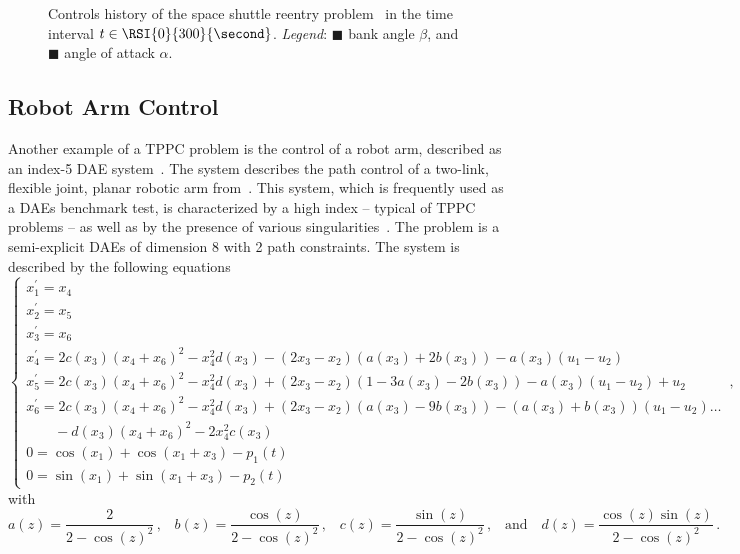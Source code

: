 \begin{figure}[htb]
  \centering
  \small{}
  \caption{Controls history of the space shuttle reentry problem~\cite{brenan1995numerical} in the time interval $t \in \RSI{0}{300}{\second}$. \emph{Legend}: \textcolor{mycolor1}{$\blacksquare$} bank angle $\beta$, and \textcolor{mycolor2}{$\blacksquare$} angle of attack $\alpha$.}
  \label{chap4:fig:tppc_final}
\end{figure}

\subsection{Robot Arm Control}

Another example of a \ac{TPPC} problem is the control of a robot arm, described as an index-5 \ac{DAE} system~\cite{pryce1998solving}. The system describes the path control of a two-link, flexible joint, planar robotic arm from~\cite{campbell1988general}. This system, which is frequently used as a \acp{DAE} benchmark test, is characterized by a high index -- typical of \ac{TPPC} problems -- as well as by the presence of various singularities~\cite{schwarz2020singularities}. The problem is a semi-explicit \acp{DAE} of dimension 8 with 2 path constraints. The system is described by the following equations
%
\begin{equation}
  \begin{cases}
    x_1^{\prime} = x_4 \\
    x_2^{\prime} = x_5 \\
    x_3^{\prime} = x_6 \\
    x_4^{\prime} = 2c(x_3)(x_4+x_6)^2 - x_4^2d(x_3) - (2x_3-x_2)(a(x_3)+2b(x_3)) - a(x_3)(u_1-u_2) \\
    x_5^{\prime} = 2c(x_3)(x_4+x_6)^2 - x_4^2d(x_3) + (2 x_3-x_2)(1-3a(x_3)-2b(x_3)) - a(x_3)(u_1-u_2) + u_2 \\
    x_6^{\prime} = 2c(x_3)(x_4+x_6)^2 - x_4^2d(x_3) + (2 x_3-x_2)(a(x_3)-9b(x_3)) - (a(x_3)+b(x_3))(u_1-u_2) \dots \\
    \qquad - d(x_3)(x_4+x_6)^2 - 2x_4^2c(x_3) \\
    0 = \cos(x_1) + \cos(x_1+x_3) - p_1(t) \\
    0 = \sin(x_1) + \sin(x_1+x_3) - p_2(t)
  \end{cases} \, \text{,}
\end{equation}
%
with
%
\begin{equation}
  a(z) = \dfrac{2}{2-\cos(z)^2} \, \text{,}
  \quad
  b(z) = \dfrac{\cos(z)}{2-\cos(z)^2} \, \text{,}
  \quad
  c(z) = \dfrac{\sin(z)}{2-\cos(z)^2} \, \text{,}
  \quad \text{and} \quad
  d(z) = \dfrac{\cos(z)\sin(z)}{2-\cos(z)^2} \, \text{.}
\end{equation}
